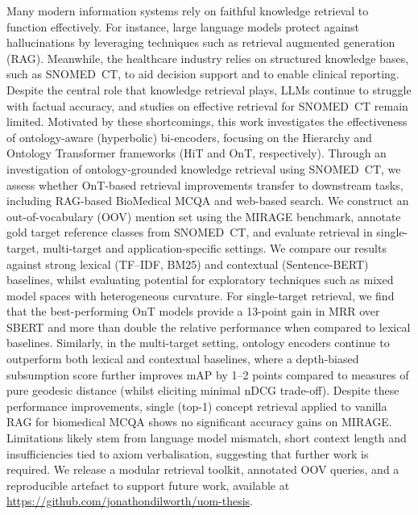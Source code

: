Many modern information systems rely on faithful knowledge retrieval to function effectively. For instance, large language models protect against hallucinations by leveraging techniques such as retrieval augmented generation (RAG). Meanwhile, the healthcare industry relies on structured knowledge bases, such as SNOMED~CT, to aid decision support and to enable clinical reporting. Despite the central role that knowledge retrieval plays, LLMs continue to struggle with factual accuracy, and studies on effective retrieval for SNOMED~CT remain limited. Motivated by these shortcomings, this work investigates the effectiveness of ontology-aware (hyperbolic) bi-encoders, focusing on the Hierarchy and Ontology Transformer frameworks (HiT and OnT, respectively). Through an investigation of ontology-grounded knowledge retrieval using SNOMED~CT, we assess whether OnT-based retrieval improvements transfer to downstream tasks, including RAG-based BioMedical MCQA and web-based search. We construct an out-of-vocabulary (OOV) mention set using the MIRAGE benchmark, annotate gold target reference classes from SNOMED~CT, and evaluate retrieval in single-target, multi-target and application-specific settings. We compare our results against strong lexical (TF--IDF, BM25) and contextual (Sentence-BERT) baselines, whilst evaluating potential for exploratory techniques such as mixed model spaces with heterogeneous curvature. For single-target retrieval, we find that the best-performing OnT models provide a 13-point gain in MRR over SBERT and more than double the relative performance when compared to lexical baselines. Similarly, in the multi-target setting, ontology encoders continue to outperform both lexical and contextual baselines, where a depth-biased subsumption score further improves mAP by 1--2 points compared to measures of pure geodesic distance (whilst eliciting minimal nDCG trade-off). Despite these performance improvements, single (top-1) concept retrieval applied to vanilla RAG for biomedical MCQA shows no significant accuracy gains on MIRAGE. Limitations likely stem from language model mismatch, short context length and insufficiencies tied to axiom verbalisation, suggesting that further work is required. We release a modular retrieval toolkit, annotated OOV queries, and a reproducible artefact to support future work, available at \url{https://github.com/jonathondilworth/uom-thesis}.